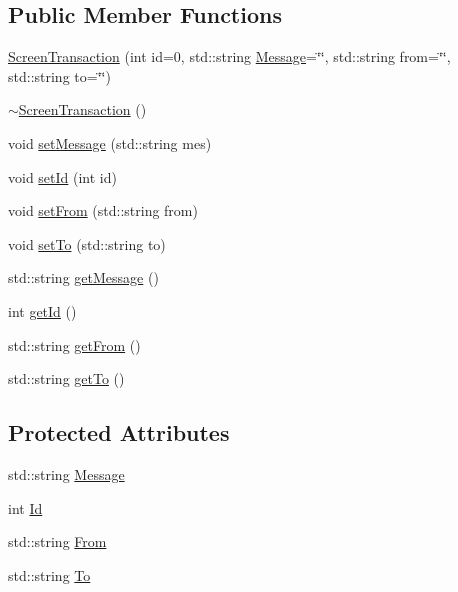 \subsection*{Public Member Functions}
\begin{DoxyCompactItemize}
\item 
\hyperlink{class_screen_transaction_a5776ea6c2a6b7c7ec51744831e8e63b2}{Screen\-Transaction} (int id=0, std\-::string \hyperlink{class_screen_transaction_a212573d9bccda5210fb4bf82211fce07}{Message}=\char`\"{}\char`\"{}, std\-::string from=\char`\"{}\char`\"{}, std\-::string to=\char`\"{}\char`\"{})
\item 
\hyperlink{class_screen_transaction_a4200c29ba71151f7eb7c626d8495429e}{$\sim$\-Screen\-Transaction} ()
\item 
void \hyperlink{class_screen_transaction_a2fde50d60fd9dfefc3f93fdb9fadf0ae}{set\-Message} (std\-::string mes)
\item 
void \hyperlink{class_screen_transaction_ae739629ae1f93e5754fc69f1d9ee96f7}{set\-Id} (int id)
\item 
void \hyperlink{class_screen_transaction_a5d652df4b9a696dbef724096b782b51e}{set\-From} (std\-::string from)
\item 
void \hyperlink{class_screen_transaction_aeb8dd00f22a18d66e36453c523fe9d83}{set\-To} (std\-::string to)
\item 
std\-::string \hyperlink{class_screen_transaction_af012c8b10760e5ed7baf2c62846de590}{get\-Message} ()
\item 
int \hyperlink{class_screen_transaction_a7a788d3562c6ea040c1a4c0165fdc32a}{get\-Id} ()
\item 
std\-::string \hyperlink{class_screen_transaction_a6da0ff4e8c5f24c405c18331df6fe5ac}{get\-From} ()
\item 
std\-::string \hyperlink{class_screen_transaction_a5348510109e53a87cb1233660c859e00}{get\-To} ()
\end{DoxyCompactItemize}
\subsection*{Protected Attributes}
\begin{DoxyCompactItemize}
\item 
std\-::string \hyperlink{class_screen_transaction_a212573d9bccda5210fb4bf82211fce07}{Message}
\item 
int \hyperlink{class_screen_transaction_acc2108d68c434499915514c1046d9806}{Id}
\item 
std\-::string \hyperlink{class_screen_transaction_a6beff6473b1f9537a68feede691526e2}{From}
\item 
std\-::string \hyperlink{class_screen_transaction_acadac834d980c73ac6084fb52a7f882c}{To}
\end{DoxyCompactItemize}


